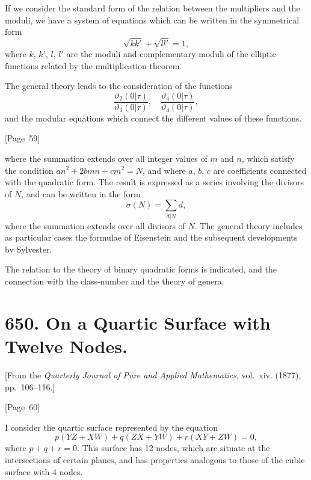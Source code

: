 \documentclass[11pt,a4paper]{article}
\theoremstyle{plain}
\theoremstyle{definition}
\theoremstyle{remark}
\begin{document}
If we consider the standard form of the relation between the
multipliers and the moduli, we have a system of equations which can be
written in the symmetrical form
\[
\sqrt{kk'} + \sqrt{ll'} = 1,
\]
where $k$, $k'$, $l$, $l'$ are the moduli and complementary moduli of
the elliptic functions related by the multiplication theorem.

The general theory leads to the consideration of the functions
\[
\frac{\vartheta_2(0|\tau)}{\vartheta_3(0|\tau)}, \quad
\frac{\vartheta_4(0|\tau)}{\vartheta_3(0|\tau)},
\]
and the modular equations which connect the different values of these
functions.

\begin{center}
[Page~59]
\end{center}

where the summation extends over all integer values of $m$ and $n$,
which satisfy the condition $an^2 + 2bmn + cm^2 = N$, and where $a$,
$b$, $c$ are coefficients connected with the quadratic form. The result
is expressed as a series involving the divisors of $N$, and can be
written in the form
\[
\sigma(N) = \sum_{d|N} d,
\]
where the summation extends over all divisors of $N$. The general
theory includes as particular cases the formulae of Eisenstein and the
subsequent developments by Sylvester.

The relation to the theory of binary quadratic forms is indicated, and
the connection with the class-number and the theory of genera.


\newpage
\section*{650. On a Quartic Surface with Twelve Nodes.}

[From the \textit{Quarterly Journal of Pure and Applied Mathematics},
vol.~xiv. (1877), pp.~106--116.]

\begin{center}
[Page~60]
\end{center}

I consider the quartic surface represented by the equation
\[
p(YZ + XW) + q(ZX + YW) + r(XY + ZW) = 0,
\]
where $p + q + r = 0$. This surface has 12 nodes, which are situate
at the intersections of certain planes, and has properties analogous
to those of the cubic surface with 4 nodes.
\end{document}
